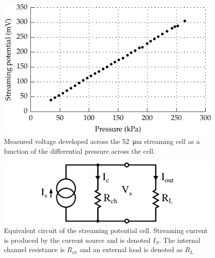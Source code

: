 \documentclass[10pt,final,journal]{IEEEtran}
\begin{document}
    \begin{figure}
        \begin{center}
        \includegraphics[width=\linewidth]{graph_voltagePressure}
        \end{center}
        \caption{Measured voltage developed across the \SI{52}{\micro\meter} streaming cell as a function of the differential pressure across the cell.}
        \label{fig:cellVoltagePressure}
    \end{figure}

    \begin{figure}
        \begin{center}
        \includegraphics[width=\linewidth]{StreamingCell_EquivalentCircuit}
        \end{center}
        \caption{Equivalent circuit of the streaming potential cell.
        Streaming current is produced by the current source and is denoted $I_{S}$.
        The internal channel resistance is $R_{ch}$ and an external load is denoted as $R_{L}$}
        \label{fig:equivalentCircuit}
    \end{figure}
\end{document}
